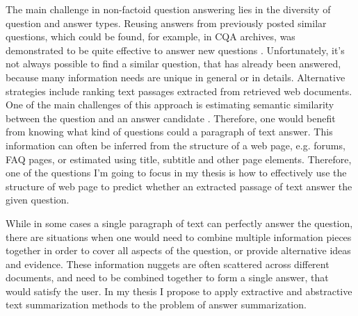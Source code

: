 The main challenge in non-factoid question answering lies in the diversity of question and answer types.
Reusing answers from previously posted similar questions, which could be found, for example, in CQA archives, was demonstrated to be quite effective to answer new questions \cite{carmel2000eresponder,Shtok:2012:LPA:2187836.2187939}.
Unfortunately, it's not always possible to find a similar question, that has already been answered, because many information needs are unique in general or in details.
Alternative strategies include ranking text passages extracted from retrieved web documents.
One of the main challenges of this approach is estimating semantic similarity between the question and an answer candidate \cite{soricut2006automatic}.
Therefore, one would benefit from knowing what kind of questions could a paragraph of text answer.
This information can often be inferred from the structure of a web page, e.g. forums, FAQ pages, or estimated using title, subtitle and other page elements.
Therefore, one of the questions I'm going to focus in my thesis is how to effectively use the structure of web page to predict whether an extracted passage of text answer the given question.

While in some cases a single paragraph of text can perfectly answer the question, there are situations when one would need to combine multiple information pieces together in order to cover all aspects of the question, or provide alternative ideas and evidence.
These information nuggets are often scattered across different documents, and need to be combined together to form a single answer, that would satisfy the user.
In my thesis I propose to apply extractive and abstractive text summarization methods to the problem of answer summarization.


